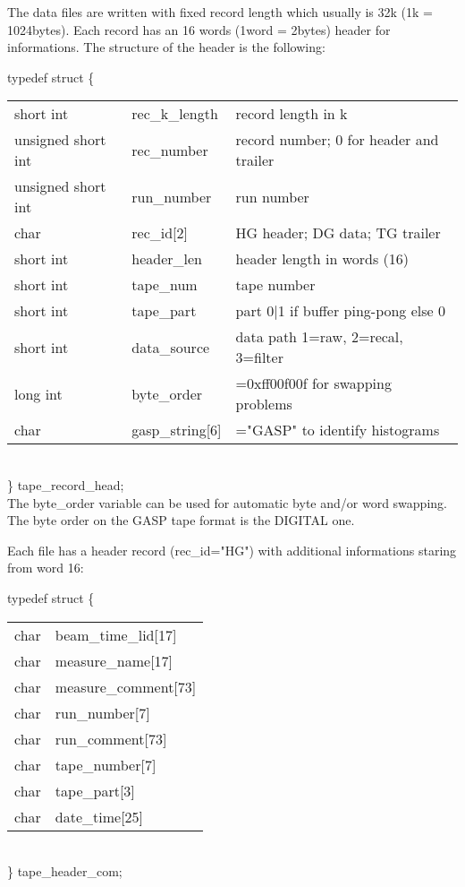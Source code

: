The data files are written with fixed record length which usually is 32k
(1k = 1024bytes). Each record has an 16 words (1word = 2bytes) header for
informations. The structure of the header is the following:

\noindent
typedef struct \{ 

\hskip1cm\parbox[t]{10cm}
{\begin{tabular}{lll}
short int	   & rec\_k\_length & record length in k \\
unsigned short int & rec\_number    & record number; 0 for header and trailer \\
unsigned short int & run\_number    & run number \\
char	 	   & rec\_id[2]	    & HG header; DG data; TG trailer \\
short int	   & header\_len    & header length in words (16) \\
short int 	   & tape\_num	    & tape number \\
short int 	   & tape\_part	    & part 0$|$1 if buffer ping-pong else 0 \\
short int	   & data\_source   & data path 1=raw, 2=recal, 3=filter \\
long int	   & byte\_order    & =0xff00f00f for swapping problems \\
char		   & gasp\_string[6]& ="GASP" to identify histograms
\end{tabular}
} \\
\noindent
\} tape\_record\_head;\\

The byte\_order variable can be used for automatic byte and/or word swapping.
The byte order on the GASP tape format is the DIGITAL one.

Each file has a header record (rec\_id="HG") with additional informations
staring from word 16:

\noindent
typedef struct \{ 

\hskip1cm\parbox[t]{10cm}
{\begin{tabular}{ll}
char	& beam\_time\_lid[17] \\
char	& measure\_name[17] \\
char	& measure\_comment[73] \\
char	& run\_number[7] \\
char	& run\_comment[73] \\
char	& tape\_number[7] \\
char	& tape\_part[3] \\
char	& date\_time[25] \\
\end{tabular}
} \\
\noindent
\} tape\_header\_com; \\

